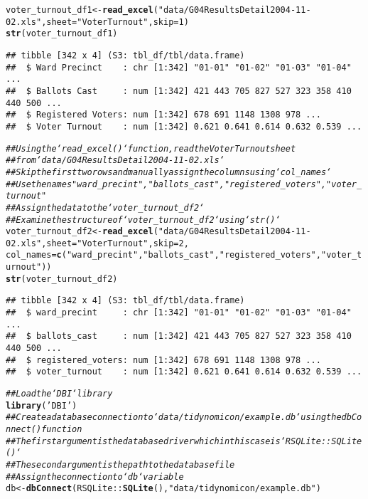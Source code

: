\documentclass{article}\usepackage[]{graphicx}\usepackage[]{xcolor}
\makeatletter
\newcommand{\hlnum}[1]{\textcolor[rgb]{0.686,0.059,0.569}{#1}}%
\newcommand{\hlstr}[1]{\textcolor[rgb]{0.192,0.494,0.8}{#1}}%
\newcommand{\hlcom}[1]{\textcolor[rgb]{0.678,0.584,0.686}{\textit{#1}}}%
\newcommand{\hlopt}[1]{\textcolor[rgb]{0,0,0}{#1}}%
\newcommand{\hlstd}[1]{\textcolor[rgb]{0.345,0.345,0.345}{#1}}%
\newcommand{\hlkwb}[1]{\textcolor[rgb]{0.69,0.353,0.396}{#1}}%
\newcommand{\hlkwc}[1]{\textcolor[rgb]{0.333,0.667,0.333}{#1}}%
\newcommand{\hlkwd}[1]{\textcolor[rgb]{0.737,0.353,0.396}{\textbf{#1}}}%
\newenvironment{kframe}{%
 \def\at@end@of@kframe{}%
 \ifinner\ifhmode%
  \def\at@end@of@kframe{\end{minipage}}%
  \begin{minipage}{\columnwidth}%
 \fi\fi%
 \def\FrameCommand##1{\hskip\@totalleftmargin \hskip-\fboxsep
 \colorbox{shadecolor}{##1}\hskip-\fboxsep
     \hskip-\linewidth \hskip-\@totalleftmargin \hskip\columnwidth}%
 \MakeFramed {\advance\hsize-\width
   \@totalleftmargin\z@ \linewidth\hsize
   \@setminipage}}%
 {\par\unskip\endMakeFramed%
 \at@end@of@kframe}
\newenvironment{knitrout}{}{} %
\makeatother
\begin{document}
\begin{knitrout}
\begin{kframe}
\begin{alltt}
\hlstd{voter_turnout_df1} \hlkwb{<-} \hlkwd{read_excel}\hlstd{(}\hlstr{"data/G04ResultsDetail2004-11-02.xls"}\hlstd{,} \hlkwc{sheet}\hlstd{=}\hlstr{"Voter Turnout"}\hlstd{,} \hlkwc{skip} \hlstd{=} \hlnum{1}\hlstd{)}
\hlkwd{str}\hlstd{(voter_turnout_df1)}
\end{alltt}
\begin{verbatim}
## tibble [342 x 4] (S3: tbl_df/tbl/data.frame)
##  $ Ward Precinct    : chr [1:342] "01-01" "01-02" "01-03" "01-04" ...
##  $ Ballots Cast     : num [1:342] 421 443 705 827 527 323 358 410 440 500 ...
##  $ Registered Voters: num [1:342] 678 691 1148 1308 978 ...
##  $ Voter Turnout    : num [1:342] 0.621 0.641 0.614 0.632 0.539 ...
\end{verbatim}
\begin{alltt}
\hlcom{## Using the `read_excel()` function, read the Voter Turnout sheet}
\hlcom{## from `data/G04ResultsDetail2004-11-02.xls`}
\hlcom{## Skip the first two rows and manually assign the columns using `col_names`}
\hlcom{## Use the names "ward_precint", "ballots_cast", "registered_voters", "voter_turnout"}
\hlcom{## Assign the data to the `voter_turnout_df2`}
\hlcom{## Examine the structure of `voter_turnout_df2` using `str()`}
\hlstd{voter_turnout_df2} \hlkwb{<-} \hlkwd{read_excel}\hlstd{(}\hlstr{"data/G04ResultsDetail2004-11-02.xls"}\hlstd{,} \hlkwc{sheet}\hlstd{=}\hlstr{"Voter Turnout"}\hlstd{,} \hlkwc{skip}\hlstd{=}\hlnum{2}\hlstd{,}
                                \hlkwc{col_names} \hlstd{=} \hlkwd{c}\hlstd{(}\hlstr{"ward_precint"}\hlstd{,} \hlstr{"ballots_cast"}\hlstd{,} \hlstr{"registered_voters"}\hlstd{,} \hlstr{"voter_turnout"}\hlstd{))}
\hlkwd{str}\hlstd{(voter_turnout_df2)}
\end{alltt}
\begin{verbatim}
## tibble [342 x 4] (S3: tbl_df/tbl/data.frame)
##  $ ward_precint     : chr [1:342] "01-01" "01-02" "01-03" "01-04" ...
##  $ ballots_cast     : num [1:342] 421 443 705 827 527 323 358 410 440 500 ...
##  $ registered_voters: num [1:342] 678 691 1148 1308 978 ...
##  $ voter_turnout    : num [1:342] 0.621 0.641 0.614 0.632 0.539 ...
\end{verbatim}
\begin{alltt}
\hlcom{## Load the `DBI` library}
\hlkwd{library}\hlstd{(}\hlstr{'DBI'}\hlstd{)}
\hlcom{## Create a database connection to `data/tidynomicon/example.db` using the dbConnect() function}
\hlcom{## The first argument is the database driver which in this case is `RSQLite::SQLite()`}
\hlcom{## The second argument is the path to the database file}
\hlcom{## Assign the connection to `db` variable}
\hlstd{db} \hlkwb{<-} \hlkwd{dbConnect}\hlstd{(RSQLite}\hlopt{::}\hlkwd{SQLite}\hlstd{(),}\hlstr{"data/tidynomicon/example.db"}\hlstd{)}


\end{alltt}
\end{kframe}
\end{knitrout}
\end{document}
